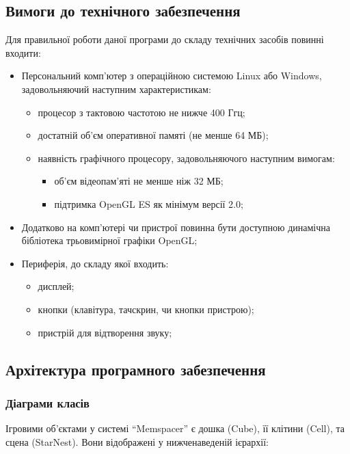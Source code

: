 \subsection{Вимоги до технічного забезпечення}

Для правильної роботи даної програми до складу технічних засобів повинні входити:

\begin{itemize}[label=$\bullet$]
  \item Персональний комп'ютер з операційною системою Linux або Windows, задовольняючий наступним характеристикам:
  \begin{itemize}
    \item процесор з тактовою частотою не нижче 400 Ггц;
    \item достатній об'єм оперативної памяті (не менше 64 МБ);
    \item наявність графічного процесору, задовольняючого наступним вимогам:
    \begin{itemize}
      \item об'єм відеопам'яті не менше ніж 32 МБ;
      \item підтримка OpenGL ES як мінімум версії 2.0;
    \end{itemize}
  \end{itemize}
  \item Додатково на комп'ютері чи пристрої повинна бути доступною динамічна бібліотека трьовимірної графіки OpenGL;
  \item Периферія, до складу якої входить:
  \begin{itemize}
    \item дисплей;
    \item кнопки (клавітура, тачскрин, чи кнопки пристрою);
    \item пристрій для відтворення звуку;
  \end{itemize}
\end{itemize}

\subsection{Архітектура програмного забезпечення}

\subsubsection{Діаграми класів}

Ігровими об'єктами у системі ``Memspacer'' є дошка (Cube), її клітини (Cell), та сцена (StarNest). Вони відображені у нижченаведеній ієрархії:

